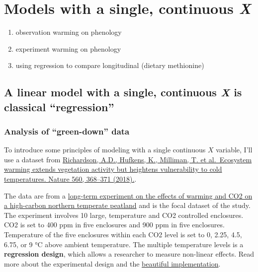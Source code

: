 \documentclass[]{book}
\providecommand{\tightlist}{%
  \setlength{\itemsep}{0pt}\setlength{\parskip}{0pt}}
\begin{document}
\hypertarget{models-with-a-single-continuous-x}{%
\chapter{\texorpdfstring{Models with a single, continuous \emph{X}}{Models with a single, continuous X}}\label{models-with-a-single-continuous-x}}

\begin{enumerate}
\def\labelenumi{\arabic{enumi}.}
\tightlist
\item
  observation warming on phenology
\item
  experiment warming on phenology
\item
  using regression to compare longitudinal (dietary methionine)
\end{enumerate}

\hypertarget{a-linear-model-with-a-single-continuous-x-is-classical-regression}{%
\section{\texorpdfstring{A linear model with a single, continuous \emph{X} is classical ``regression''}{A linear model with a single, continuous X is classical ``regression''}}\label{a-linear-model-with-a-single-continuous-x-is-classical-regression}}

\hypertarget{analysis-of-green-down-data}{%
\subsection{Analysis of ``green-down'' data}\label{analysis-of-green-down-data}}

To introduce some principles of modeling with a single continuous \(X\) variable, I'll use a dataset from \href{https://doi.org/10.1038/s41586-018-0399-1}{Richardson, A.D., Hufkens, K., Milliman, T. et al.~Ecosystem warming extends vegetation activity but heightens vulnerability to cold temperatures. Nature 560, 368--371 (2018).}.

The data are from a \href{https://mnspruce.ornl.gov}{long-term experiment on the effects of warming and CO2 on a high-carbon northern temperate peatland} and is the focal dataset of the study. The experiment involves 10 large, temperature and CO2 controlled enclosures. CO2 is set to 400 ppm in five enclosures and 900 ppm in five enclosures. Temperature of the five enclosures within each CO2 level is set to 0, 2.25, 4.5, 6.75, or 9 °C above ambient temperature. The multiple temperature levels is a \textbf{regression design}, which allows a researcher to measure non-linear effects. Read more about the experimental design and the \href{https://mnspruce.ornl.gov/design}{beautiful implementation}.
\end{document}
